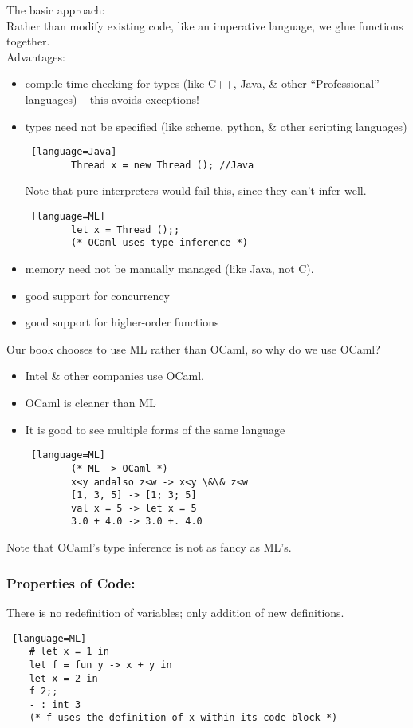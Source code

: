 \documentclass[../../lecture_notes.tex]{subfiles}
\begin{document}
\noindent The basic approach:\\
Rather than modify existing code, like an imperative language, we glue functions together.\\
Advantages:
\begin{itemize}
	\item compile-time checking for types (like C++, Java, \& other “Professional” languages)
		 -- this avoids exceptions!
	\item types need not be specified (like scheme, python, \& other scripting languages)
		\begin{lstlisting} [language=Java]
		Thread x = new Thread (); //Java
		\end{lstlisting}
		Note that pure interpreters would fail this, since they can’t infer well.
		\begin{lstlisting} [language=ML]
		let x = Thread ();;
		(* OCaml uses type inference *)
		\end{lstlisting}
	\item memory need not be manually managed (like Java, not C).
	\item good support for concurrency
	\item good support for higher-order functions
\end{itemize}
\noindent Our book chooses to use ML rather than OCaml, so why do we use OCaml?
\begin{itemize} [itemsep=0mm]
	\item Intel \& other companies use OCaml.
	\item OCaml is cleaner than ML
	\item It is good to see multiple forms of the same language
	\begin{lstlisting} [language=ML]
		(* ML -> OCaml *)
		x<y andalso z<w -> x<y \&\& z<w
		[1, 3, 5] -> [1; 3; 5]
		val x = 5 -> let x = 5
		3.0 + 4.0 -> 3.0 +. 4.0
	\end{lstlisting}
\end{itemize}
\noindent Note that OCaml’s type inference is not as fancy as ML’s. \medskip

\subsubsection*{Properties of Code:}
There is no redefinition of variables; only addition of new definitions.
\begin{lstlisting} [language=ML]
	# let x = 1 in
	let f = fun y -> x + y in
	let x = 2 in
	f 2;;
	- : int 3
	(* f uses the definition of x within its code block *)
\end{lstlisting} \medskip
\end{document}
